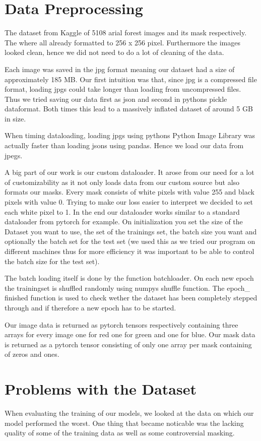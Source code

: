 \section{Data Preprocessing}
The dataset from Kaggle of 5108 arial forest images and its mask
respectively. The where all already formatted to 256 x 256 pixel.
Furthermore the images looked clean, hence we did not need to do
a lot of cleaning of the data.

Each image was saved in the jpg format meaning our
dataset had a size of approximately 185 MB.
Our first intuition was that, since jpg is a
compressed file format, loading jpgs could take longer
than loading from uncompressed files. Thus we tried saving our
data first as json and second in pythons pickle dataformat.
Both times this lead to a massively inflated dataset of
around 5 GB in size.

When timing dataloading, loading jpgs using pythons
Python Image Library was actually faster than loading jsons
using pandas. Hence we load our data from jpegs.

A big part of our work is our custom dataloader.
It arose from our need for a lot of customizability as it not
only loads data from our custom source but also formats our masks.
 Every mask consists of white pixels with value 255 and black
 pixels with value 0. Trying to make our loss easier to interpret
 we decided to set each white pixel to 1.
In the end our dataloader works similar to a standard dataloader
from pytorch for example.
On initialization you set the size of the Dataset you want to
use, the set of the trainings set, the batch size you want and
optionally the batch set for the test set
(we used this as we tried our program on different machines thus for
more efficiency it was important to be able to control the batch size
for the test set).

The batch loading itself is done by the function batchloader.
On each new epoch the trainingset is shuffled randomly using numpys
shuffle function. The epoch\_ finished function is used to check wether
 the dataset has been completely stepped through and if therefore a new
 epoch has to be started.

Our image data is returned as pytorch tensors respectively containing
three arrays for every image one for red one for green and one for blue.
 Our mask data is returned as a pytorch tensor consisting of only one
  array per mask containing of zeros and ones.

  \section{Problems with the Dataset}
  When evaluating the training of our models, we looked at the data on which our model performed the worst. One thing that became noticable was the lacking quality of some of the training data as well as some controversial masking.

